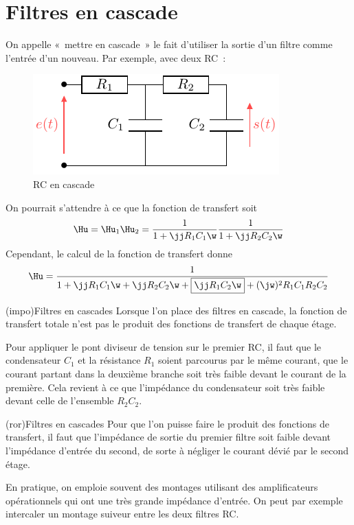 \documentclass[../../main/main.tex]{subfiles}
\begin{document}
\section{Filtres en cascade}
On appelle «~mettre en cascade~» le fait d'utiliser la sortie d'un filtre comme
l'entrée d'un nouveau. Par exemple, avec deux RC~:
\begin{figure}[htbp]
	\centering
	\includegraphics[width=.5\linewidth]{filtre_rcrc}
	\caption{RC en cascade}
	\label{fig:rcrc}
\end{figure}
On pourrait s'attendre à ce que la fonction de transfert soit
\[
	\Hu = \Hu_1\Hu_2 = \frac{1}{1+\jj R_1C_1\w} \frac{1}{1+\jj R_2C_2\w}
\]
Cependant, le calcul de la fonction de transfert donne
\[
	\Hu = \frac{1}{1 + \jj R_1C_1\w + \jj R_2C_2\w + \boxed{\jj R_1C_2\w} +
		(\jw)^{2}R_1C_1R_2C_2}
\]
\begin{tcb}(impo){Filtres en cascades}
	Lorsque l'on place des filtres en cascade, la fonction de transfert totale
	n'est pas le produit des fonctions de transfert de chaque étage.
\end{tcb}

Pour appliquer le pont diviseur de tension sur le premier RC, il faut que le
condensateur $C_1$ et la résistance $R_1$ soient parcourus par le même courant,
que le courant partant dans la deuxième branche soit très faible devant le
courant de la première. Cela revient à ce que l'impédance du condensateur soit
très faible devant celle de l'ensemble $R_2C_2$.

\begin{tcb}[cnt](ror){Filtres en cascades}
	Pour que l'on puisse faire le produit des fonctions de transfert, il faut que
	l'impédance de sortie du premier filtre soit faible devant l'impédance d'entrée
	du second, de sorte à négliger le courant dévié par le second étage.
\end{tcb}

En pratique, on emploie souvent des montages utilisant des amplificateurs
opérationnels qui ont une très grande impédance d'entrée. On peut par exemple
intercaler un montage suiveur entre les deux filtres RC.
\end{document}
